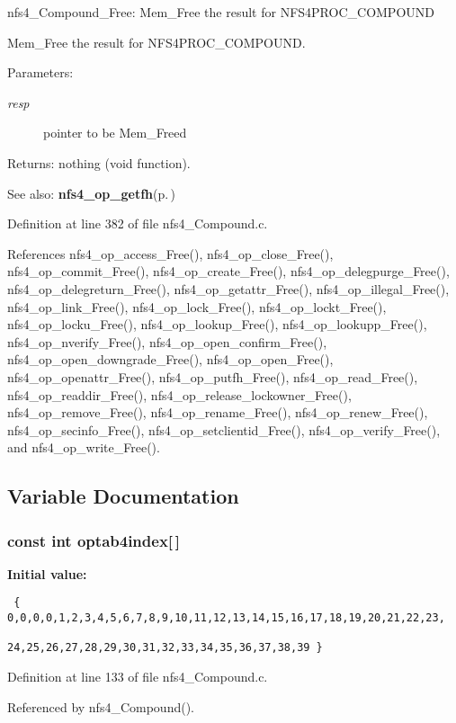 nfs4\_\-Compound\_\-Free: Mem\_\-Free the result for NFS4PROC\_\-COMPOUND

Mem\_\-Free the result for NFS4PROC\_\-COMPOUND.

\begin{Desc}
\item[Parameters:]
\begin{description}
\item[{\em resp}]pointer to be Mem\_\-Freed\end{description}
\end{Desc}
\begin{Desc}
\item[Returns:]nothing (void function).\end{Desc}
\begin{Desc}
\item[See also:]{\bf nfs4\_\-op\_\-getfh}{\rm (p.\,\pageref{nfs4__op__getfh_8c_a0})} \end{Desc}


Definition at line 382 of file nfs4\_\-Compound.c.

References nfs4\_\-op\_\-access\_\-Free(), nfs4\_\-op\_\-close\_\-Free(), nfs4\_\-op\_\-commit\_\-Free(), nfs4\_\-op\_\-create\_\-Free(), nfs4\_\-op\_\-delegpurge\_\-Free(), nfs4\_\-op\_\-delegreturn\_\-Free(), nfs4\_\-op\_\-getattr\_\-Free(), nfs4\_\-op\_\-illegal\_\-Free(), nfs4\_\-op\_\-link\_\-Free(), nfs4\_\-op\_\-lock\_\-Free(), nfs4\_\-op\_\-lockt\_\-Free(), nfs4\_\-op\_\-locku\_\-Free(), nfs4\_\-op\_\-lookup\_\-Free(), nfs4\_\-op\_\-lookupp\_\-Free(), nfs4\_\-op\_\-nverify\_\-Free(), nfs4\_\-op\_\-open\_\-confirm\_\-Free(), nfs4\_\-op\_\-open\_\-downgrade\_\-Free(), nfs4\_\-op\_\-open\_\-Free(), nfs4\_\-op\_\-openattr\_\-Free(), nfs4\_\-op\_\-putfh\_\-Free(), nfs4\_\-op\_\-read\_\-Free(), nfs4\_\-op\_\-readdir\_\-Free(), nfs4\_\-op\_\-release\_\-lockowner\_\-Free(), nfs4\_\-op\_\-remove\_\-Free(), nfs4\_\-op\_\-rename\_\-Free(), nfs4\_\-op\_\-renew\_\-Free(), nfs4\_\-op\_\-secinfo\_\-Free(), nfs4\_\-op\_\-setclientid\_\-Free(), nfs4\_\-op\_\-verify\_\-Free(), and nfs4\_\-op\_\-write\_\-Free().

\subsection{Variable Documentation}
\subsubsection{\setlength{\rightskip}{0pt plus 5cm}const int {\bf optab4index}[$\,$]}\label{nfs4__Compound_8c_a2}


{\bf Initial value:}

\footnotesize\begin{verbatim} { 0,0,0,0,1,2,3,4,5,6,7,8,9,10,11,12,13,14,15,16,17,18,19,20,21,22,23,
                            24,25,26,27,28,29,30,31,32,33,34,35,36,37,38,39 }
\end{verbatim}\normalsize 


Definition at line 133 of file nfs4\_\-Compound.c.

Referenced by nfs4\_\-Compound().